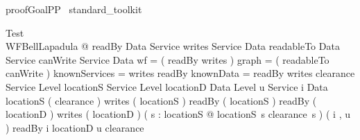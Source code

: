 \begin{zsection}	 \SECTION proofGoalPP \parents~standard\_toolkit
\end{zsection}



 

\begin{theorem}{ Test}\\
 \forall WFBellLapadula @ readBy \in Data \rel Service \land writes \in Service \rel Data \land readableTo \in Data \rel Service \land canWrite \in Service \rel Data \land wf = ( readBy \comp writes ) \plus \land graph = ( readableTo \comp canWrite ) \plus \land knownServices = \dom writes \cup \ran readBy \land knownData = \dom readBy \cup \ran writes \land clearance \in Service \pfun Level \land locationS \in Service \pfun Level \land locationD \in Data \pfun Level \land u \in Service \land i \in Data \land \dom locationS \in \power ( \dom clearance ) \land \dom writes \in \power ( \dom locationS ) \land \ran readBy \in \power ( \dom locationS ) \land \dom readBy \in \power ( \dom locationD ) \land \ran writes \in \power ( \dom locationD ) \land ( \forall s : \dom locationS @ locationS~s \leq clearance~s ) \land ( i , u ) \in readBy \implies i \in \dom locationD \land u \in \dom clearance \\

\end{theorem}



 
